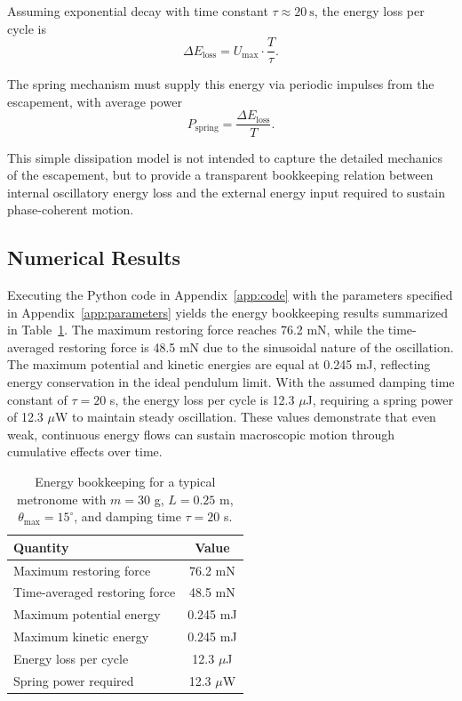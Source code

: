 \documentclass[
 reprint,
 amsmath,amssymb,
 aps,
 prb,
]{revtex4-2}
\numberwithin{equation}{section}
\begin{document}
Assuming exponential decay with time constant $\tau \approx 20~\text{s}$, the energy loss per cycle is
\begin{equation}
\Delta E_\text{loss} = U_\text{max} \cdot \frac{T}{\tau}.
\label{eq:energy_loss}
\end{equation}

The spring mechanism must supply this energy via periodic impulses from the escapement, with average power
\begin{equation}
P_\text{spring} = \frac{\Delta E_\text{loss}}{T}.
\label{eq:spring_power}
\end{equation}

This simple dissipation model is not intended to capture the detailed mechanics of the escapement, but to provide a transparent bookkeeping relation between internal oscillatory energy loss and the external energy input required to sustain phase-coherent motion.

\subsection{Numerical Results}
\label{app:numerical}

Executing the Python code in Appendix~\ref{app:code} with the parameters specified in Appendix~\ref{app:parameters} yields the energy bookkeeping results summarized in Table~\ref{tab:metronome_energy}. The maximum restoring force reaches 76.2 mN, while the time-averaged restoring force is 48.5 mN due to the sinusoidal nature of the oscillation. The maximum potential and kinetic energies are equal at 0.245 mJ, reflecting energy conservation in the ideal pendulum limit. With the assumed damping time constant of $\tau = 20$ s, the energy loss per cycle is 12.3 $\mu$J, requiring a spring power of 12.3 $\mu$W to maintain steady oscillation. These values demonstrate that even weak, continuous energy flows can sustain macroscopic motion through cumulative effects over time.

\begin{table}[ht!]
\centering
\begin{tabular*}{\columnwidth}{@{\extracolsep{\fill}}lc@{}}
\toprule
\textbf{Quantity} & \textbf{Value} \\
\midrule
Maximum restoring force & 76.2 mN \\
Time-averaged restoring force & 48.5 mN \\
Maximum potential energy & 0.245 mJ \\
Maximum kinetic energy & 0.245 mJ \\
Energy loss per cycle & 12.3 $\mu$J \\
Spring power required & 12.3 $\mu$W \\
\bottomrule
\end{tabular*}
\caption{\justifying Energy bookkeeping for a typical metronome with $m=30$ g, $L=0.25$ m, $\theta_\text{max}=15^\circ$, and damping time $\tau=20$ s.}
\label{tab:metronome_energy}
\end{table}
\end{document}
